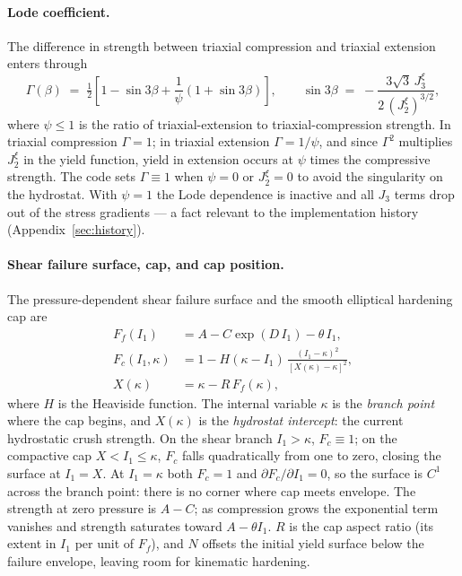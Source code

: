 \documentclass[12pt]{article}
\begin{document}
\paragraph{Lode coefficient.}
The difference in strength between triaxial compression and triaxial
extension enters through
\citep[Eqs.~34--36]{Sun.Chen.Ostien:2014}
\begin{equation}
  \Gamma(\beta) \;=\;
    \tfrac{1}{2}\left[
      1 - \sin 3\beta
    + \frac{1}{\psi}\left(1 + \sin 3\beta\right)
    \right],
  \qquad
  \sin 3\beta \;=\; -\frac{3\sqrt{3}\,J_3^\xi}{2\,(J_2^\xi)^{3/2}},
  \label{eq:Gamma}
\end{equation}
where $\psi \le 1$ is the ratio of triaxial-extension to
triaxial-compression strength. In triaxial compression $\Gamma = 1$;
in triaxial extension $\Gamma = 1/\psi$, and since $\Gamma^2$
multiplies $J_2^\xi$ in the yield function, yield in extension occurs
at $\psi$ times the compressive strength. The code sets
$\Gamma \equiv 1$ when $\psi = 0$ or $J_2^\xi = 0$ to avoid the
singularity on the hydrostat. With $\psi = 1$ the Lode dependence is
inactive and all $J_3$ terms drop out of the stress gradients ---
a fact relevant to the implementation history
(Appendix~\ref{sec:history}).

\paragraph{Shear failure surface, cap, and cap position.}
The pressure-dependent shear failure surface and the smooth
elliptical hardening cap
\citep[Eqs.~32, 37--38]{Sun.Chen.Ostien:2014} are
\begin{align}
  F_f(I_1) &= A - C \exp(D\,I_1) - \theta\,I_1,
             \label{eq:Ff}\\
  F_c(I_1,\kappa) &=
    1 - H(\kappa - I_1)\,\frac{(I_1 - \kappa)^2}{[X(\kappa) - \kappa]^2},
             \label{eq:Fc}\\
  X(\kappa) &= \kappa - R\,F_f(\kappa),
             \label{eq:X}
\end{align}
where $H$ is the Heaviside function. The internal variable $\kappa$
is the \emph{branch point} where the cap begins, and $X(\kappa)$ is
the \emph{hydrostat intercept}: the current hydrostatic crush
strength. On the shear branch $I_1 > \kappa$, $F_c \equiv 1$; on the
compactive cap $X < I_1 \le \kappa$, $F_c$ falls quadratically from
one to zero, closing the surface at $I_1 = X$. At $I_1 = \kappa$
both $F_c = 1$ and $\partial F_c/\partial I_1 = 0$, so the surface is
$C^1$ across the branch point: there is no corner where cap meets
envelope. The strength at zero pressure is $A - C$; as compression
grows the exponential term vanishes and strength saturates toward
$A - \theta I_1$. $R$ is the cap aspect ratio (its extent in $I_1$
per unit of $F_f$), and $N$ offsets the initial yield surface below
the failure envelope, leaving room for kinematic hardening.
\end{document}
